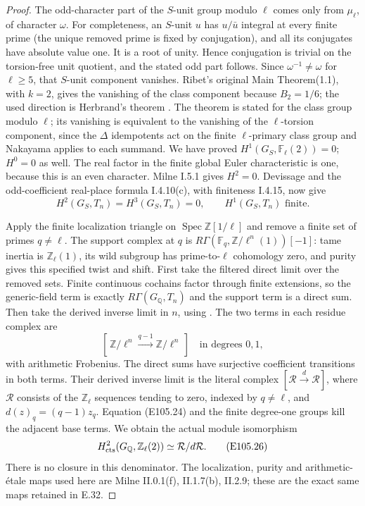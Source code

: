 \begin{proof}
The odd-character part of the $S$-unit group modulo
$\ell$ comes only from $\mu_\ell$, of character $\omega$.
For completeness, an $S$-unit $u$ has $u/\bar u$ integral
at every finite prime (the unique removed prime is fixed
by conjugation), and all its conjugates have absolute
value one.  It is a root of unity.  Hence conjugation is
trivial on the torsion-free unit quotient, and the stated
odd part follows.  Since $\omega^{-1}\ne\omega$ for
$\ell\ge5$, that $S$-unit component vanishes.
Ribet's original Main Theorem(1.1), with $k=2$, gives
the vanishing of the class component because $B_2=1/6$;
the used direction is Herbrand's theorem
\cite[p.151]{E105_Ribet1976}.
The theorem is stated for the class group modulo $\ell$;
its vanishing is equivalent to the vanishing of the
$\ell$-torsion component, since the $\Delta$ idempotents
act on the finite $\ell$-primary class group and Nakayama
applies to each summand.
We have proved $H^1(G_S,\mathbb F_\ell(2))=0$;
$H^0=0$ as well.  The real factor in the finite global
Euler characteristic is one, because this is an even
character.  Milne I.5.1 gives $H^2=0$.
Devissage and the odd-coefficient real-place formula
I.4.10(c), with finiteness I.4.15, now give
\[
 H^2(G_S,T_n)=H^3(G_S,T_n)=0,
                      \qquad H^1(G_S,T_n)\text{ finite}.
 \tag{E105.24}
\]

Apply the finite localization triangle on
$\operatorname{Spec}\mathbb Z[1/\ell]$ and remove a finite
set of primes $q\ne\ell$.
The support complex at $q$ is
$R\Gamma(\mathbb F_q,\mathbb Z/\ell^n(1))[-1]$:
tame inertia is $\mathbb Z_\ell(1)$, its wild subgroup has
prime-to-$\ell$ cohomology zero, and purity gives this
specified twist and shift.
First take the filtered direct limit over the removed
sets.  Finite continuous cochains factor through finite
extensions, so the generic-field term is exactly
$R\Gamma(G_{\mathbb Q},T_n)$ and the support term is
a direct sum.  Then take the derived inverse limit in
$n$, using \cite[Proposition1.6, Theorem2.2]{E_JannsenContinuous}.
The two terms in each residue complex are
\[
 [\,\mathbb Z/\ell^n\xrightarrow{q-1}\mathbb Z/\ell^n\,]
 \quad\text{in degrees }0,1,
 \tag{E105.25}
\]
with arithmetic Frobenius.  The direct sums have
surjective coefficient transitions in both terms.
Their derived inverse limit is the literal complex
$[\mathcal R\xrightarrow{d}\mathcal R]$, where
$\mathcal R$ consists of the $\mathbb Z_\ell$ sequences
tending to zero, indexed by $q\ne\ell$, and
$d(z)_q=(q-1)z_q$.
Equation (E105.24) and the finite degree-one groups kill
the adjacent base terms.  We obtain the actual module
isomorphism
\[
 H^2_{\rm cts}(G_{\mathbb Q},\mathbb Z_\ell(2))
       \simeq\mathcal R/d\mathcal R.
 \tag{E105.26}
\]
There is no closure in this denominator.
The localization, purity and arithmetic-\'etale maps used
here are Milne II.0.1(f), II.1.7(b), II.2.9; these are
the exact same maps retained in E.32.


\end{proof}
